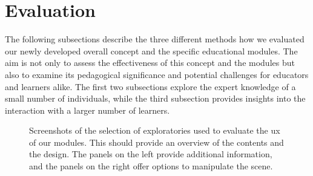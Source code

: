 \section{Evaluation}
The following subsections describe the three different methods how we evaluated our newly developed overall concept and the specific educational modules. The aim is not only to assess the effectiveness of this concept and the modules but also to examine its pedagogical significance and potential challenges for educators and learners alike. The first two subsections explore the expert knowledge of a small number of individuals, while the third subsection provides insights into the interaction with a larger number of learners.

\begin{figure}[tbh]
	\centering
	\captionsetup{labelfont=bf,textfont=it}
	\caption[Screenshots of user evaluated exploratories.]{Screenshots of the selection of exploratories used to evaluate the \acrshort{ux} of our modules. This should provide an overview of the contents and the design. The panels on the left provide additional information, and the panels on the right offer options to manipulate the scene.}
	\label{fig:uxEval}
\end{figure}
